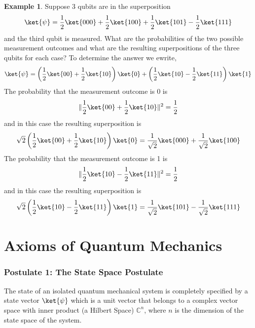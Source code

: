 \documentclass[12pt, oneside]{book}
\theoremstyle{definition}
\theoremstyle{definition}
\newtheorem{example}{Example}[section]
\theoremstyle{remark}
\begin{document}
\begin{example}
    Suppose 3 qubits are in the superposition
    \[\ket{\psi}=\frac{1}{2}\ket{000}+\frac{1}{2}\ket{100}+\frac{1}{2}\ket{101}-\frac{1}{2}\ket{111}\]
    and the third qubit is measured. What are the probabilities of the two possible measurement outcomes and what are the resulting superpositions of the three qubits for each case?
    To determine the answer we ewrite,
    \[
    \ket{\psi}=\left(\frac{1}{2}\ket{00}+\frac{1}{2}\ket{10}\right)\ket{0}+\left(\frac{1}{2}\ket{10}-\frac{1}{2}\ket{11}\right)\ket{1}
    \]
    The probability that the measurement outcome is 0 is
    \[
    \|\frac{1}{2}\ket{00}+\frac{1}{2}\ket{10}\|^2=\frac{1}{2}
    \]
    and in this case the resulting superposition is 
    \[
    \sqrt{2}\left(\frac{1}{2}\ket{00}+\frac{1}{2}\ket{10}\right)\ket{0}=\frac{1}{\sqrt{2}}\ket{000}+\frac{1}{\sqrt{2}}\ket{100}
    \]
    The probability that the measurement outcome is 1 is
    \[
    \|\frac{1}{2}\ket{10}-\frac{1}{2}\ket{11}\|^2=\frac{1}{2}
    \]
    and in this case the resulting superposition is
    \[
    \sqrt{2}\left(\frac{1}{2}\ket{10}-\frac{1}{2}\ket{11}\right)\ket{1}=\frac{1}{\sqrt{2}}\ket{101}-\frac{1}{\sqrt{2}}\ket{111}
    \]
\end{example}









\chapter{Axioms of Quantum Mechanics}
\subsection{Postulate 1: The State Space Postulate}
The state of an isolated quantum mechanical system is completely specified by a state vector $\ket{\psi}$ 
which is a unit vector that belongs to a complex vector space with inner product (a Hilbert Space) $\mathbb{C}^{n}$, where $n$ is the 
dimension of the state space of the system. 
\end{document}
